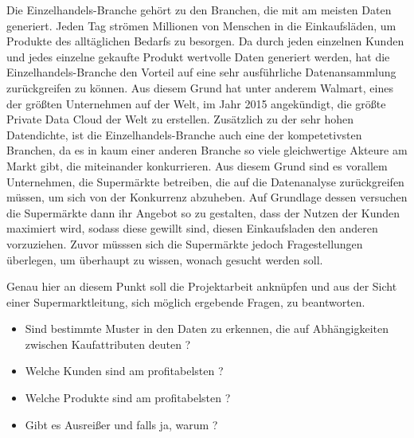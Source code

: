 \documentclass[usegeometry=true]{scrartcl}
\begin{document}
\noindent Die Einzelhandels-Branche gehört zu den Branchen, die mit am meisten Daten generiert.
Jeden Tag strömen Millionen von Menschen in die Einkaufsläden, um Produkte des alltäglichen Bedarfs zu besorgen.
Da durch jeden einzelnen Kunden und jedes einzelne gekaufte Produkt wertvolle Daten generiert werden, hat die Einzelhandels-Branche den Vorteil auf eine sehr ausführliche
Datenansammlung zurückgreifen zu können.
Aus diesem Grund hat unter anderem Walmart, eines der größten Unternehmen auf der Welt, im Jahr 2015 angekündigt, die größte Private Data Cloud der Welt
zu erstellen.\cite[5]{marr2016big}
Zusätzlich zu der sehr hohen Datendichte, ist die Einzelhandels-Branche auch eine der kompetetivsten Branchen, da es in kaum einer anderen Branche
so viele gleichwertige Akteure am Markt gibt, die miteinander konkurrieren.\cite{Grewal2010}
Aus diesem Grund sind es vorallem Unternehmen, die Supermärkte betreiben, die auf die Datenanalyse zurückgreifen müssen, um sich von der Konkurrenz abzuheben.
Auf Grundlage dessen versuchen die Supermärkte dann ihr Angebot so zu gestalten, dass der Nutzen der Kunden maximiert wird, sodass diese gewillt sind, diesen Einkaufsladen den anderen vorzuziehen.\cite[6]{marr2016big}
Zuvor müsssen sich die Supermärkte jedoch Fragestellungen überlegen, um überhaupt zu wissen, wonach gesucht werden soll.

\noindent Genau hier an diesem Punkt soll die Projektarbeit anknüpfen und aus der Sicht einer Supermarktleitung, sich möglich ergebende Fragen, zu beantworten.

\begin{itemize}
	\item Sind bestimmte Muster in den Daten zu erkennen, die auf Abhängigkeiten zwischen Kaufattributen deuten ?
	\item Welche Kunden sind am profitabelsten ?
	\item Welche Produkte sind am profitabelsten ?
	\item Gibt es Ausreißer und falls ja, warum ?
\end{itemize}
\end{document}

